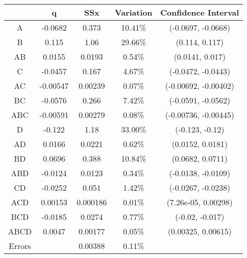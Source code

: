 \begin{center}
\begin{tabular}{|c|c|c|c|c|}
\cline{2-5}
\multicolumn{1}{c|}{} & q & SSx & Variation & Confidence Interval \\
\hline
A&-0.0682&0.373&10.41\% &(-0.0697, -0.0668) \\
\hline
B&0.115&1.06&29.66\% &(0.114, 0.117) \\
\hline
AB&0.0155&0.0193&0.54\% &(0.0141, 0.017) \\
\hline
C&-0.0457&0.167&4.67\% &(-0.0472, -0.0443) \\
\hline
AC&-0.00547&0.00239&0.07\% &(-0.00692, -0.00402) \\
\hline
BC&-0.0576&0.266&7.42\% &(-0.0591, -0.0562) \\
\hline
ABC&-0.00591&0.00279&0.08\% &(-0.00736, -0.00445) \\
\hline
D&-0.122&1.18&33.00\% &(-0.123, -0.12) \\
\hline
AD&0.0166&0.0221&0.62\% &(0.0152, 0.0181) \\
\hline
BD&0.0696&0.388&10.84\% &(0.0682, 0.0711) \\
\hline
ABD&-0.0124&0.0123&0.34\% &(-0.0138, -0.0109) \\
\hline
CD&-0.0252&0.051&1.42\% &(-0.0267, -0.0238) \\
\hline
ACD&0.00153&0.000186&0.01\% &(7.26e-05, 0.00298) \\
\hline
BCD&-0.0185&0.0274&0.77\% &(-0.02, -0.017) \\
\hline
ABCD&0.0047&0.00177&0.05\% &(0.00325, 0.00615) \\
\hline
Errors& &0.00388&0.11\% & \\
\hline
\end{tabular}
\end{center}
